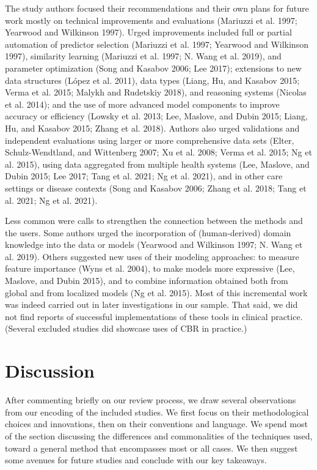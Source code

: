 \documentclass{article}
\begin{document}
The study authors focused their recommendations and their own plans for
future work mostly on technical improvements and evaluations (Mariuzzi
et al. 1997; Yearwood and Wilkinson 1997). Urged improvements included
full or partial automation of predictor selection (Mariuzzi et al. 1997;
Yearwood and Wilkinson 1997), similarity learning (Mariuzzi et al. 1997;
N. Wang et al. 2019), and parameter optimization (Song and Kasabov 2006;
Lee 2017); extensions to new data structures (López et al. 2011), data
types (Liang, Hu, and Kasabov 2015; Verma et al. 2015; Malykh and
Rudetskiy 2018), and reasoning systems (Nicolas et al. 2014); and the
use of more advanced model components to improve accuracy or efficiency
(Lowsky et al. 2013; Lee, Maslove, and Dubin 2015; Liang, Hu, and
Kasabov 2015; Zhang et al. 2018). Authors also urged validations and
independent evaluations using larger or more comprehensive data sets
(Elter, Schulz-Wendtland, and Wittenberg 2007; Xu et al. 2008; Verma et
al. 2015; Ng et al. 2015), using data aggregated from multiple health
systems (Lee, Maslove, and Dubin 2015; Lee 2017; Tang et al. 2021; Ng et
al. 2021), and in other care settings or disease contexts (Song and
Kasabov 2006; Zhang et al. 2018; Tang et al. 2021; Ng et al. 2021).

Less common were calls to strengthen the connection between the methods
and the users. Some authors urged the incorporation of (human-derived)
domain knowledge into the data or models (Yearwood and Wilkinson 1997;
N. Wang et al. 2019). Others suggested new uses of their modeling
approaches: to measure feature importance (Wyns et al. 2004), to make
models more expressive (Lee, Maslove, and Dubin 2015), and to combine
information obtained both from global and from localized models (Ng et
al. 2015). Most of this incremental work was indeed carried out in later
investigations in our sample. That said, we did not find reports of
successful implementations of these tools in clinical practice. (Several
excluded studies did showcase uses of CBR in practice.)

\hypertarget{discussion}{%
\section{Discussion}\label{discussion}}

After commenting briefly on our review process, we draw several
observations from our encoding of the included studies. We first focus
on their methodological choices and innovations, then on their
conventions and language. We spend most of the section discussing the
differences and commonalities of the techniques used, toward a general
method that encompasses most or all cases. We then suggest some avenues
for future studies and conclude with our key takeaways.
\end{document}
